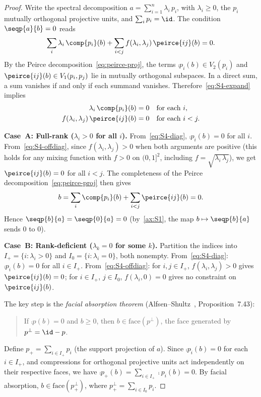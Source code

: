 \begin{proof}
Write the spectral decomposition $a = \sum_{i=1}^{n}
\lambda_{i}\, p_{i}$, with $\lambda_{i} \geq 0$, the $p_{i}$
mutually orthogonal projective units, and $\sum_{i} p_{i} = \id$.
The condition $\seqp{a}{b} = 0$ reads
\begin{equation}\label{eq:S4-expand}
  \sum_{i} \lambda_{i}\, \comp{p_{i}}(b)
  + \sum_{i < j} f(\lambda_{i}, \lambda_{j})\, \peirce{ij}(b)
  = 0.
\end{equation}
By the Peirce decomposition~\eqref{eq:peirce-proj}, the terms
$\comp{p_{i}}(b) \in V_{2}(p_{i})$ and
$\peirce{ij}(b) \in V_{1}(p_{i}, p_{j})$ lie in mutually
orthogonal subspaces.  In a direct sum, a sum vanishes if and only if
each summand vanishes.  Therefore~\eqref{eq:S4-expand} implies
\begin{align}
  \lambda_{i}\, \comp{p_{i}}(b) &= 0
  \quad \text{for each } i,
  \label{eq:S4-diag}\\
  f(\lambda_{i}, \lambda_{j})\, \peirce{ij}(b) &= 0
  \quad \text{for each } i < j.
  \label{eq:S4-offdiag}
\end{align}

\medskip
\noindent\textbf{Case~A: Full-rank ($\lambda_{i} > 0$ for all $i$).}
From~\eqref{eq:S4-diag}, $\comp{p_{i}}(b) = 0$ for all $i$.
From~\eqref{eq:S4-offdiag}, since $f(\lambda_{i}, \lambda_{j}) > 0$
when both arguments are positive (this holds for any mixing function
with $f > 0$ on $(0,1]^{2}$, including
$f = \sqrt{\lambda_{i}\, \lambda_{j}}$), we get
$\peirce{ij}(b) = 0$ for all $i < j$.  The completeness of the Peirce
decomposition~\eqref{eq:peirce-proj} then gives
\[
  b = \sum_{i} \comp{p_{i}}(b) + \sum_{i < j} \peirce{ij}(b) = 0.
\]
Hence $\seqp{b}{a} = \seqp{0}{a} = 0$ (by~\ref{ax:S1}, the map
$b \mapsto \seqp{b}{a}$ sends $0$ to $0$).

\medskip
\noindent\textbf{Case~B: Rank-deficient ($\lambda_{k} = 0$
for some $k$).}
Partition the indices into $I_{+} = \{i : \lambda_{i} > 0\}$ and
$I_{0} = \{i : \lambda_{i} = 0\}$, both nonempty.
From~\eqref{eq:S4-diag}: $\comp{p_{i}}(b) = 0$ for all $i \in I_{+}$.
From~\eqref{eq:S4-offdiag}: for $i, j \in I_{+}$,
$f(\lambda_{i}, \lambda_{j}) > 0$ gives
$\peirce{ij}(b) = 0$; for $i \in I_{+}$, $j \in I_{0}$,
$f(\lambda_{i}, 0) = 0$ gives no constraint on
$\peirce{ij}(b)$.

The key step is the \emph{facial absorption theorem}
(Alfsen--Shultz~\cite{AlfsenShultz2003}, Proposition~7.43):
\begin{quote}
  If $\comp{p}(b) = 0$ and $b \geq 0$, then
  $b \in \mathrm{face}(p^{\perp})$, the face generated by
  $p^{\perp} = \id - p$.
\end{quote}
Define $p_{+} = \sum_{i \in I_{+}} p_{i}$ (the support projection of
$a$).  Since $\comp{p_{i}}(b) = 0$ for each $i \in I_{+}$, and
compressions for orthogonal projective units act independently on
their respective faces, we have
$\comp{p_{+}}(b) = \sum_{i \in I_{+}} \comp{p_{i}}(b) = 0$.
By facial absorption, $b \in \mathrm{face}(p_{+}^{\perp})$, where
$p_{+}^{\perp} = \sum_{i \in I_{0}} p_{i}$.


\end{proof}
